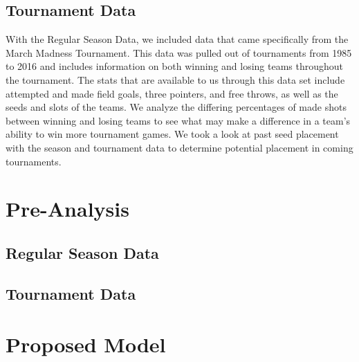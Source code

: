 \documentclass[]{scrartcl}
\begin{document}
\subsection*{Tournament Data}
With the Regular Season Data, we included data that came specifically from the March Madness Tournament. This data was pulled out of tournaments from 1985 to 2016 and includes information on both winning and losing teams throughout the tournament. The stats that are available to us through this data set include attempted and made field goals, three pointers, and free throws, as well as the seeds and slots of the teams. We analyze the differing percentages of made shots between winning and losing teams to see what may make a difference in a team's ability to win more tournament games. We took a look at past seed placement with the season and tournament data to determine potential placement in coming tournaments.

\section*{Pre-Analysis}
\subsection*{Regular Season Data}
\subsection*{Tournament Data}
\section*{Proposed Model}
\end{document}
